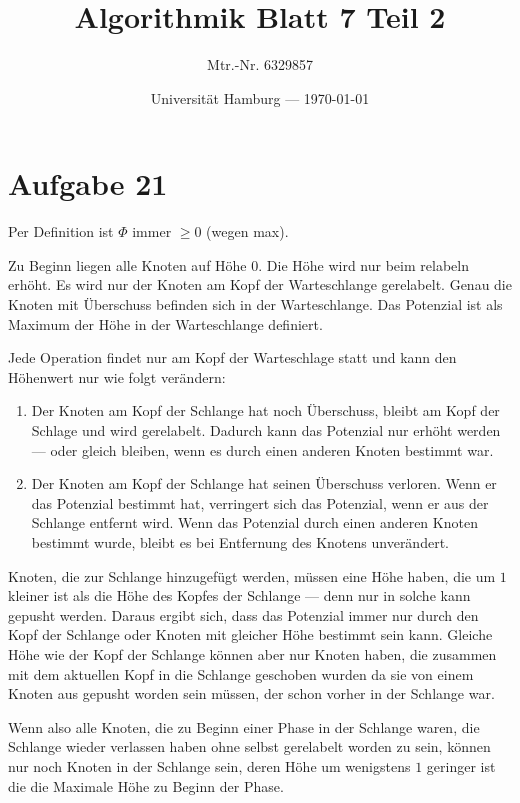 \documentclass[parskip=half,a4paper]{scrartcl}
\title{Algorithmik Blatt 7 Teil 2}
\author{Mtr.-Nr. 6329857}
\date{Universität Hamburg --- \today}
\begin{document}
\maketitle %
\linenumbers

\section*{Aufgabe 21}

Per Definition ist $\Phi$ immer $\ge 0$ (wegen max).

Zu Beginn liegen alle Knoten auf Höhe 0. Die Höhe wird nur beim relabeln erhöht. Es wird nur der Knoten am Kopf der Warteschlange gerelabelt. Genau die Knoten mit Überschuss befinden sich in der Warteschlange. Das Potenzial ist als Maximum der Höhe in der Warteschlange definiert.

Jede Operation findet nur am Kopf der Warteschlage statt und kann den Höhenwert nur wie folgt verändern:

\begin{enumerate}
    \item Der Knoten am Kopf der Schlange hat noch Überschuss, bleibt am Kopf der Schlage und wird gerelabelt. Dadurch kann das Potenzial nur erhöht werden --- oder gleich bleiben, wenn es durch einen anderen Knoten bestimmt war.
    \item Der Knoten am Kopf der Schlange hat seinen Überschuss verloren. Wenn er das Potenzial bestimmt hat, verringert sich das Potenzial, wenn er aus der Schlange entfernt wird. Wenn das Potenzial durch einen anderen Knoten bestimmt wurde, bleibt es bei Entfernung des Knotens unverändert.
\end{enumerate}

Knoten, die zur Schlange hinzugefügt werden, müssen eine Höhe haben, die um $1$ kleiner ist als die Höhe des Kopfes der Schlange --- denn nur in solche kann gepusht werden. Daraus ergibt sich, dass das Potenzial immer nur durch den Kopf der Schlange oder Knoten mit gleicher Höhe bestimmt sein kann. Gleiche Höhe wie der Kopf der Schlange können aber nur Knoten haben, die zusammen mit dem aktuellen Kopf in die Schlange geschoben wurden da sie von einem Knoten aus gepusht worden sein müssen, der schon vorher in der Schlange war.

Wenn also alle Knoten, die zu Beginn einer Phase in der Schlange waren, die Schlange wieder verlassen haben ohne selbst gerelabelt worden zu sein, können nur noch Knoten in der Schlange sein, deren Höhe um wenigstens $1$ geringer ist die die Maximale Höhe zu Beginn der Phase.
\end{document}

